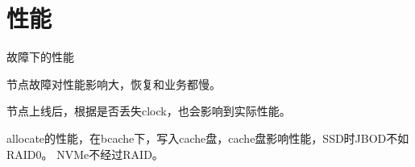 \chapter{性能}

故障下的性能

节点故障对性能影响大，恢复和业务都慢。

节点上线后，根据是否丢失clock，也会影响到实际性能。

allocate的性能，在bcache下，写入cache盘，cache盘影响性能，SSD时JBOD不如RAID0。
NVMe不经过RAID。
